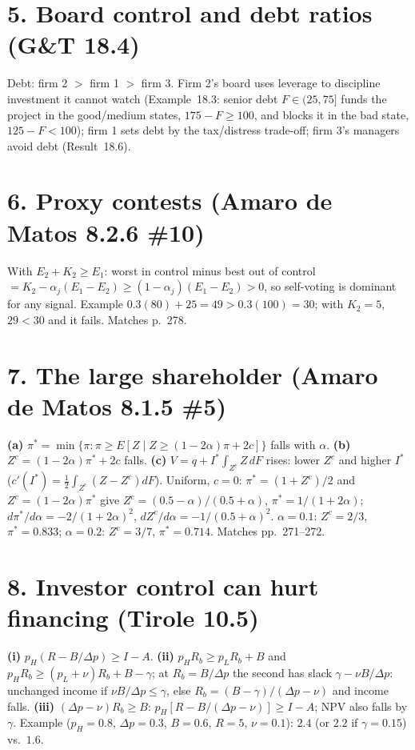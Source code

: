 \documentclass[11pt,a4paper]{article}
\newcommand{\dpp}{\Delta p}
\begin{document}
\section*{5. Board control and debt ratios (G\&T 18.4)}
Debt: firm 2 $>$ firm 1 $>$ firm 3. Firm 2's board uses leverage to discipline investment it cannot
watch (Example~18.3: senior debt $F\in(25,75]$ funds the project in the good/medium states,
$175-F\ge100$, and blocks it in the bad state, $125-F<100$); firm 1 sets debt by the tax/distress
trade-off; firm 3's managers avoid debt (Result~18.6).

\section*{6. Proxy contests (Amaro de Matos 8.2.6 \#10)}
With $E_2+K_2\ge E_1$: worst in control minus best out of control
$=K_2-\alpha_j(E_1-E_2)\ge(1-\alpha_j)(E_1-E_2)>0$, so self-voting is dominant for any signal.
Example $0.3(80)+25=49>0.3(100)=30$; with $K_2=5$, $29<30$ and it fails. Matches p.~278.

\section*{7. The large shareholder (Amaro de Matos 8.1.5 \#5)}
\textbf{(a)} $\pi^*=\min\{\pi:\pi\ge E[Z\mid Z\ge(1-2\alpha)\pi+2c]\}$ falls with $\alpha$.
\textbf{(b)} $Z^c=(1-2\alpha)\pi^*+2c$ falls. \textbf{(c)} $V=q+I^*\int_{Z^c}Z\,dF$ rises: lower
$Z^c$ and higher $I^*$ ($c'(I^*)=\tfrac12\int_{Z^c}(Z-Z^c)dF$).
Uniform, $c=0$: $\pi^*=(1+Z^c)/2$ and $Z^c=(1-2\alpha)\pi^*$ give $Z^c=(0.5-\alpha)/(0.5+\alpha)$,
$\pi^*=1/(1+2\alpha)$; $d\pi^*/d\alpha=-2/(1+2\alpha)^2$, $dZ^c/d\alpha=-1/(0.5+\alpha)^2$.
$\alpha=0.1$: $Z^c=2/3$, $\pi^*=0.833$; $\alpha=0.2$: $Z^c=3/7$, $\pi^*=0.714$. Matches pp.~271--272.

\section*{8. Investor control can hurt financing (Tirole 10.5)}
\textbf{(i)} $p_H(R-B/\dpp)\ge I-A$.
\textbf{(ii)} $p_HR_b\ge p_LR_b+B$ and $p_HR_b\ge(p_L+\nu)R_b+B-\gamma$; at $R_b=B/\dpp$ the second has
slack $\gamma-\nu B/\dpp$: unchanged income if $\nu B/\dpp\le\gamma$, else $R_b=(B-\gamma)/(\dpp-\nu)$
and income falls.
\textbf{(iii)} $(\dpp-\nu)R_b\ge B$: $p_H[R-B/(\dpp-\nu)]\ge I-A$; NPV also falls by $\gamma$.
Example ($p_H=0.8$, $\dpp=0.3$, $B=0.6$, $R=5$, $\nu=0.1$): $2.4$ (or $2.2$ if $\gamma=0.15$) vs.\ $1.6$.
\end{document}
